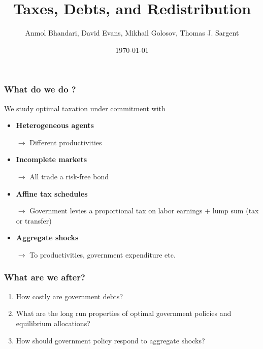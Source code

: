\documentclass{beamer}
\title {Taxes, Debts,  and Redistribution}
\author{Anmol Bhandari, David Evans, Mikhail Golosov, Thomas J. Sargent}
\date{\today}
\begin{document}
%
\begin{frame}
\titlepage

\end{frame}

\begin{frame}
\frametitle{What do we do ?}
We study optimal taxation under commitment with
\begin{itemize}
 \item \textbf{Heterogeneous agents}

 \quad \color{red}$\rightarrow$ \color{black} Different productivities

 \item \textbf{Incomplete markets}

 \quad \color{red}$\rightarrow$ \color{black}All trade a risk-free bond

 \item \textbf{Affine tax schedules}

 \quad \color{red}$\rightarrow$ \color{black}Government levies a proportional tax on labor earnings + lump sum (tax or transfer)

 \item \textbf{Aggregate shocks}

 \quad \color{red}$\rightarrow$ \color{black} To productivities, government expenditure etc.

 \end{itemize}
\end{frame}


\begin{frame}
\frametitle{What are we after?}

\begin{enumerate}
 \item How costly are government debts?
 \item What are the long run properties of optimal government policies and equilibrium allocations?
\item How should government policy respond to aggregate shocks?
\end{enumerate}

\end{frame}
\end{document}
